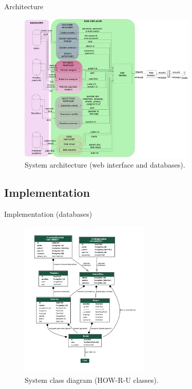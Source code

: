\documentclass{beamer}
\begin{document}
\begin{frame}[fragile]{Architecture}
\begin{figure}[H]
    \includegraphics[width=0.75\textwidth]{web_int.pdf}
    \caption{System architecture (web interface and databases).}
\end{figure}
\end{frame}

\subsection{Implementation}


\begin{frame}[fragile]{Implementation (databases)}
  \begin{figure}[H]
    \centering
      \includegraphics[width=0.55\textwidth]{class_diagram_zoom.pdf}
      \caption{System class diagram (HOW-R-U classes).}
  \end{figure}
\end{frame}
\end{document}
